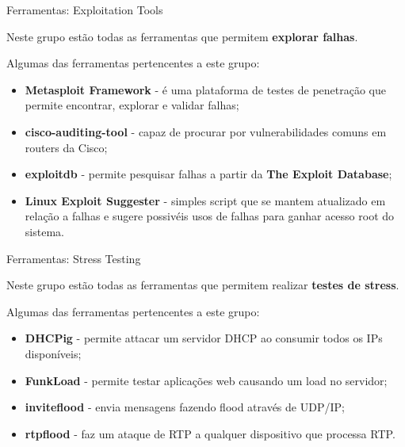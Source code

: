 \documentclass{beamer}
\begin{document}
\begin{frame}{Ferramentas: Exploitation Tools}

Neste grupo estão todas as ferramentas que permitem \textbf{explorar falhas}.

\hfill

Algumas das ferramentas pertencentes a este grupo:
    \begin{itemize}
        \item \textbf{Metasploit Framework} - é uma plataforma de testes de penetração que permite encontrar, explorar e validar falhas;
        \item \textbf{cisco-auditing-tool} - capaz de procurar por vulnerabilidades comuns em routers da Cisco;
        \item \textbf{exploitdb} - permite pesquisar falhas a partir da \textbf{The Exploit Database};
        \item \textbf{Linux Exploit Suggester} - simples script que se mantem atualizado em relação a falhas e sugere possivéis usos de falhas para ganhar acesso root do sistema.
    \end{itemize}
\end{frame}
\begin{frame}{Ferramentas: Stress Testing}

Neste grupo estão todas as ferramentas que permitem realizar \textbf{testes de stress}.

\hfill

Algumas das ferramentas pertencentes a este grupo:
    \begin{itemize}
        \item \textbf{DHCPig} - permite attacar um servidor DHCP ao consumir todos os IPs disponíveis;
        \item \textbf{FunkLoad} - permite testar aplicações web causando um load no servidor;
        \item \textbf{inviteflood} - envia mensagens fazendo flood através de UDP/IP;
        \item \textbf{rtpflood} - faz um ataque de RTP a qualquer dispositivo que processa RTP.
    \end{itemize}
\end{frame}
\end{document}
